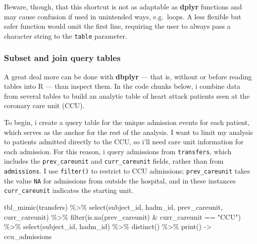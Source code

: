 \documentclass[
]{article}
\newenvironment{Shaded}{\begin{snugshade}}{\end{snugshade}}
\newcommand{\FunctionTok}[1]{\textcolor[rgb]{0.00,0.00,0.00}{#1}}
\newcommand{\NormalTok}[1]{#1}
\newcommand{\OtherTok}[1]{\textcolor[rgb]{0.56,0.35,0.01}{#1}}
\newcommand{\SpecialCharTok}[1]{\textcolor[rgb]{0.00,0.00,0.00}{#1}}
\newcommand{\StringTok}[1]{\textcolor[rgb]{0.31,0.60,0.02}{#1}}
\begin{document}
Beware, though, that this shortcut is not as adaptable as \textbf{dplyr}
functions and may cause confusion if used in unintended ways,
e.g.~loops. A less flexible but safer function would omit the first
line, requiring the user to always pass a character string to the
\texttt{table} parameter.

\hypertarget{subset-and-join-query-tables}{%
\subsubsection{Subset and join query
tables}\label{subset-and-join-query-tables}}

A great deal more can be done with \textbf{dbplyr} --- that is, without
or before reading tables into R --- than inspect them. In the code
chunks below, i combine data from several tables to build an analytic
table of heart attack patients seen at the coronary care unit (CCU).

To begin, i create a query table for the unique admission events for
each patient, which serves as the anchor for the rest of the analysis. I
want to limit my analysis to patients admitted directly to the CCU, so
i'll need care unit information for each admission. For this reason, i
query admissions from \texttt{transfers}, which includes the
\texttt{prev\_careunit} and \texttt{curr\_careunit} fields, rather than
from \texttt{admissions}. I use \texttt{filter()} to restrict to CCU
admissions; \texttt{prev\_careunit} takes the value \texttt{NA} for
admissions from outside the hospital, and in these instances
\texttt{curr\_careunit} indicates the starting unit.

\begin{Shaded}
\begin{Highlighting}[]
\FunctionTok{tbl\_mimic}\NormalTok{(transfers) }\SpecialCharTok{\%\textgreater{}\%}
  \FunctionTok{select}\NormalTok{(subject\_id, hadm\_id, prev\_careunit, curr\_careunit) }\SpecialCharTok{\%\textgreater{}\%}
  \FunctionTok{filter}\NormalTok{(}\FunctionTok{is.na}\NormalTok{(prev\_careunit) }\SpecialCharTok{\&}\NormalTok{ curr\_careunit }\SpecialCharTok{==} \StringTok{"CCU"}\NormalTok{) }\SpecialCharTok{\%\textgreater{}\%}
  \FunctionTok{select}\NormalTok{(subject\_id, hadm\_id) }\SpecialCharTok{\%\textgreater{}\%}
  \FunctionTok{distinct}\NormalTok{() }\SpecialCharTok{\%\textgreater{}\%}
  \FunctionTok{print}\NormalTok{() }\OtherTok{{-}\textgreater{}}\NormalTok{ ccu\_admissions}
\end{Highlighting}
\end{Shaded}
\end{document}
